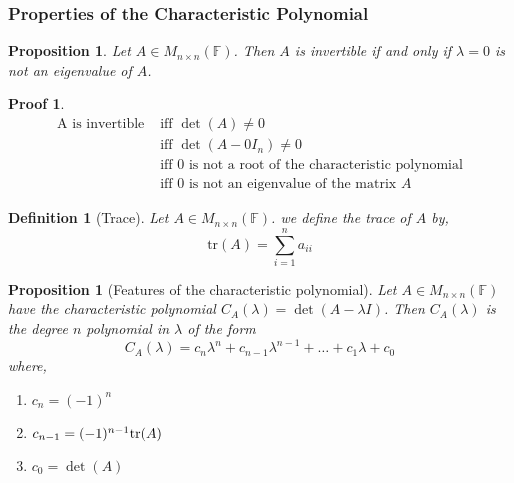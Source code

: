 \documentclass[10pt]{article}
\theoremstyle{break}
\newtheorem*{pf}{Proof}
\newtheorem{defn}{Definition}[subsection]
\newtheorem{prop}[thm]{Proposition}
\begin{document}
\subsubsection{Properties of the Characteristic Polynomial}
\begin{prop}
    Let $A \in M_{n \times n}(\mathbb{F})$. Then $A$ is invertible if and only if $\lambda = 0$ is not an eigenvalue of $A$.
\end{prop}
\begin{pf}
    \begin{align*}
        \text{A is invertible } 
        &\text{iff }\det(A) \ne 0\\
        &\text{iff }\det(A - 0I_n) \ne 0\\
        &\text{iff }0 \text{ is not a root of the characteristic polynomial}\\
        &\text{iff } 0 \text{ is not an eigenvalue of the matrix } A
    \end{align*}
\end{pf}
\begin{defn}[Trace]
  Let $A \in M_{n \times n}(\mathbb{F})$. we define the trace of $A$ by, $$\text{tr}(A) = \sum^n_{i=1}a_{ii}$$
\end{defn}
\begin{prop}[Features of the characteristic polynomial]
  Let $A \in M_{n \times n}(\mathbb{F})$ have the characteristic polynomial $C_A(\lambda) = \det(A - \lambda I)$. Then $C_A(\lambda)$ is the degree $n$ polynomial in $\lambda $ of the form
  $$C_A(\lambda) = c_n\lambda^n + c_{n-1}\lambda^{n-1} + \dots + c_1\lambda + c_0$$
  where, 
  \begin{enumerate}
    \item $c_n = (-1)^n$
    \item $c_{n-1} = (-1)^{n-1}\space \text{tr}(A)$
    \item $c_0 = \det(A)$
  \end{enumerate}
\end{prop}
\end{document}
